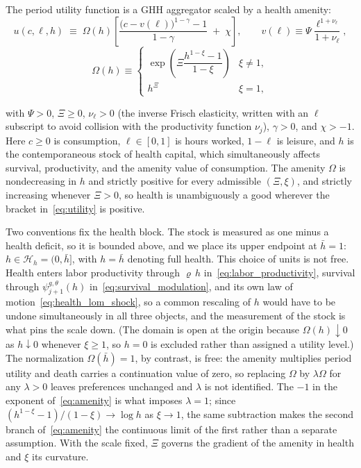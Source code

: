 \documentclass[12pt,a4paper]{article}
\begin{document}
The period utility function is a GHH aggregator scaled by a health amenity:
\begin{equation}
\label{eq:utility}
u(c, \ell, h) \;\equiv\; \Omega(h) \left[ \frac{\bigl(c - v(\ell)\bigr)^{1-\gamma} - 1}{1 - \gamma} \;+\; \chi \right],
\qquad
v(\ell) \equiv \Psi \frac{\ell^{1+\nu_\ell}}{1+\nu_\ell},
\end{equation}
\begin{equation}
\label{eq:amenity}
    \Omega(h) \equiv
\begin{cases}
\exp\!\left(\Xi \dfrac{h^{1-\xi} - 1}{1-\xi}\right) & \xi \neq 1,\\[8pt]
h^{\Xi} & \xi = 1,
\end{cases}
\end{equation}

with $\Psi > 0$, $\Xi \geq 0$, $\nu_\ell > 0$ (the inverse Frisch elasticity, written with an $\ell$ subscript to avoid collision with the productivity function $\nu_j$), $\gamma > 0$, and $\chi > -1$. Here $c \geq 0$ is consumption, $\ell \in [0, 1]$ is hours worked, $1-\ell$ is leisure, and $h$ is the contemporaneous stock of health capital, which simultaneously affects survival, productivity, and the amenity value of consumption. The amenity $\Omega$ is nondecreasing in $h$ and strictly positive for every admissible $(\Xi,\xi)$, and strictly increasing whenever $\Xi > 0$, so health is unambiguously a good wherever the bracket in~\eqref{eq:utility} is positive.

Two conventions fix the health block. The stock is measured as one minus a health deficit, so it is bounded above, and we place its upper endpoint at $\bar h = 1$: $h \in \mathcal{H}_h = (0, \bar h]$, with $h = \bar h$ denoting full health. This choice of units is not free. Health enters labor productivity through $\varrho\, h$ in~\eqref{eq:labor_productivity}, survival through $\psi^{g,\theta}_{j+1}(h)$ in~\eqref{eq:survival_modulation}, and its own law of motion~\eqref{eq:health_lom_shock}, so a common rescaling of $h$ would have to be undone simultaneously in all three objects, and the measurement of the stock is what pins the scale down. (The domain is open at the origin because $\Omega(h) \downarrow 0$ as $h \downarrow 0$ whenever $\xi \geq 1$, so $h = 0$ is excluded rather than assigned a utility level.) The normalization $\Omega(\bar h) = 1$, by contrast, is free: the amenity multiplies period utility and death carries a continuation value of zero, so replacing $\Omega$ by $\lambda \Omega$ for any $\lambda > 0$ leaves preferences unchanged and $\lambda$ is not identified. The $-1$ in the exponent of~\eqref{eq:amenity} is what imposes $\lambda = 1$; since $(h^{1-\xi} - 1)/(1-\xi) \to \log h$ as $\xi \to 1$, the same subtraction makes the second branch of~\eqref{eq:amenity} the continuous limit of the first rather than a separate assumption. With the scale fixed, $\Xi$ governs the gradient of the amenity in health and $\xi$ its curvature.
\end{document}
